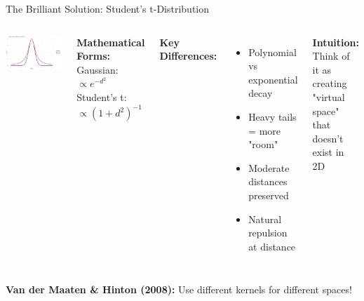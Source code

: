\documentclass[aspectratio=169]{beamer}
\newcommand{\intuition}[1]{\colorbox{green!10}{\textcolor{intuitioncolor}{\textbf{Intuition:} #1}}}
\begin{document}
\begin{frame}{The Brilliant Solution: Student's t-Distribution}
\begin{columns}
\includegraphics[width=\textwidth]{./Figures/gaussian_vs_t_comparison.png}

\textbf{Mathematical Forms:}\\
Gaussian: $\propto e^{-d^2}$\\
Student's t: $\propto (1+d^2)^{-1}$

\textbf{Key Differences:}
\begin{itemize}
\item Polynomial vs exponential decay
\item Heavy tails = more "room"
\item Moderate distances preserved
\item Natural repulsion at distance
\end{itemize}

\intuition{Think of it as creating "virtual space" that doesn't exist in 2D}
\end{columns}

\vspace{0.3cm}
\colorbox{green!20}{\textbf{Van der Maaten \& Hinton (2008):} Use different kernels for different spaces!}
\end{frame}
\end{document}
